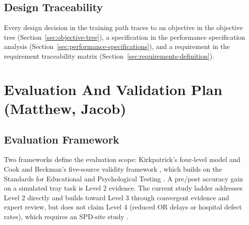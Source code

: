 \documentclass[10pt,a4paper]{article}
\begin{document}
\subsection{Design Traceability}
\label{sec:design-traceability}

Every design decision in the training path traces to an objective in the
objective tree (Section~\ref{sec:objective-tree}), a specification in
the performance specification analysis
(Section~\ref{sec:performance-specifications}), and a requirement in
the requirement traceability matrix
(Section~\ref{sec:requirements-definition}).




\section{Evaluation And Validation Plan \hfill {\normalfont\small (Matthew, Jacob)}}
\label{sec:evaluation-and-validation-plan}
\subsection{Evaluation Framework}

Two frameworks define the evaluation scope: Kirkpatrick's four-level model and Cook and Beckman's five-source validity framework \cite{kirkpatrick-evaluation-1994, cook-beckman-validity-2006}, which builds on the Standards for Educational and Psychological Testing \cite{aera-standards-2014}. A pre/post accuracy gain on a simulated tray task is Level 2 evidence. The current study ladder addresses Level 2 directly and builds toward Level 3 through convergent evidence and expert review, but does not claim Level 4 (reduced OR delays or hospital defect rates), which requires an SPD-site study \cite{arthur-et-al-2003}.
\end{document}
